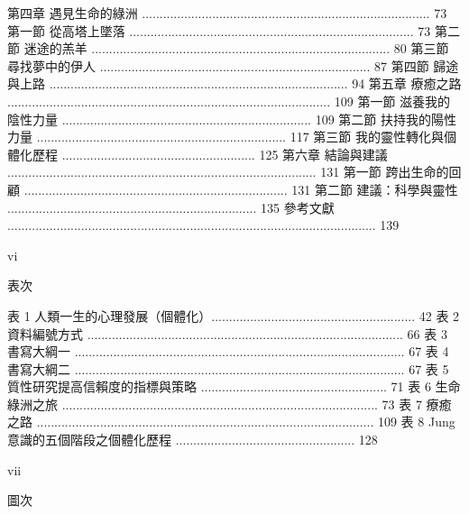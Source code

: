 第四章 遇見生命的綠洲 .................................................................................. 73 
第一節 從高塔上墜落 ................................................................................. 73 
第二節 迷途的羔羊 ..................................................................................... 80 
第三節 尋找夢中的伊人 ............................................................................. 87 
第四節 歸途與上路 ..................................................................................... 94 
第五章 療癒之路 ............................................................................................ 109 
第一節 滋養我的陰性力量 ....................................................................... 109 
第二節 扶持我的陽性力量 ....................................................................... 117 
第三節 我的靈性轉化與個體化歷程 ....................................................... 125 
第六章 結論與建議 ........................................................................................ 131 
第一節 跨出生命的回顧 ........................................................................... 131 
第二節 建議：科學與靈性 ....................................................................... 135 
參考文獻 ......................................................................................................... 139 
 
 
  
 
vi 
 
表次 
 
表 1  人類一生的心理發展（個體化）.......................................................... 42 
表 2  資料編號方式 .......................................................................................... 66 
表 3  書寫大綱一 .............................................................................................. 67 
表 4  書寫大綱二 .............................................................................................. 67 
表 5  質性研究提高信賴度的指標與策略 ..................................................... 71 
表 6  生命綠洲之旅 .......................................................................................... 73 
表 7  療癒之路 ................................................................................................ 109 
表 8  Jung 意識的五個階段之個體化歷程 ................................................... 128 
 
  
 
vii 
 
圖次 
 
